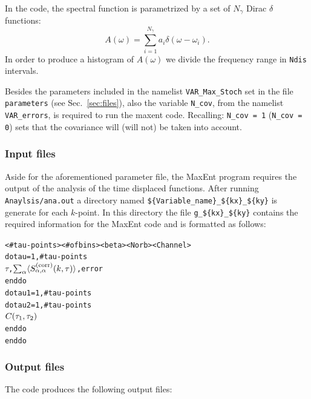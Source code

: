 In the code, the spectral function is parametrized  by a  set of $N_{\gamma}$ Dirac $\delta$ functions: 
\begin{equation}
      A(\omega)  = \sum_{i=1}^{N_{\gamma}} a_{i} \delta \left( \omega - \omega_i \right).
\end{equation}
In order to produce a histogram of  $ A(\omega) $ we divide  the frequency range in \texttt{Ndis} intervals. 

Besides the parameters included in the namelist \texttt{VAR\_Max\_Stoch} set in the file \texttt{parameters} (see Sec.~\ref{sec:files}), also the variable \texttt{N\_cov}, from the namelist \texttt{VAR\_errors}, is required to run the maxent code. Recalling: \texttt{N\_cov = 1} (\texttt{N\_cov = 0}) sets that the covariance will (will not) be taken into account.

\subsubsection*{Input files} 
Aside for the aforementioned parameter file, the MaxEnt program requires the output of the  analysis of the time displaced functions. After running \texttt{Anaylsis/ana.out} a directory named    \texttt{\$\{Variable\_name\}}\texttt{\_\$\{kx\}\_\$\{ky\}}   is  generate for each $k$-point.  In this directory  the file \texttt{g\_\$\{kx\}\_\$\{ky\}} contains the  required information for the MaxEnt code  and is  formatted as follows:
\begin{alltt}
 < # tau-points >  <# of bins >  <beta>  <Norb>  <Channel>
do tau = 1,  # tau-points
   \( \tau \),  \( \sum\sb{\alpha}\langle{S}\sb{\alpha,\alpha}\sp{(\mathrm{corr})}(k,\tau)\rangle\),   error
enddo
do tau1 = 1,  # tau-points
  do tau2 = 1,  # tau-points
     \( C( \tau\sb{1},\tau\sb{2} ) \)
  enddo
enddo
\end{alltt}



\subsubsection*{Output files}

The code produces the following output files:

